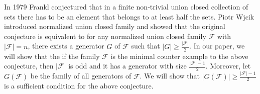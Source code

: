 \endtitle
In 1979 Frankl conjectured that in a finite non-trivial union closed
collection of sets there has to be an element that belongs to at least half
the sets. Piotr Wjcik introduced normalized union closed family and showed that the original conjecture is equivalent to for any normalized union closed family $\mathcal{F}$ with $|\mathcal{F}|=n$, there exists a generator $G$ of $\mathcal{F}$ such that $|G|\geq \frac{|\mathcal{F}|}{2}$. In our paper, we will show that the if the family $\mathcal{F}$ is the minimal counter example to the above conjecture, then $|\mathcal{F}|$ is odd and it has a generator with size $\frac{|\mathcal{F}|-1}{2}$. 
Moreover, let $G(\mathcal{F})$ be the family of all generators of $\mathcal{F}$. We will show that $|G(\mathcal{F})|\geq \frac{|\mathcal{F}|-1}{2}$ is a sufficient condition for the above conjecture.
